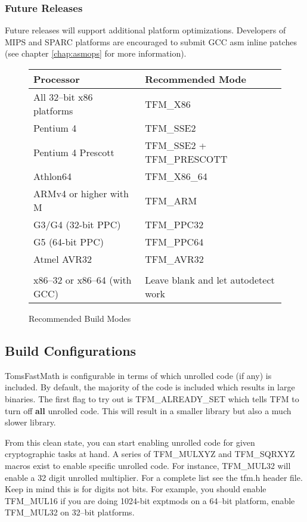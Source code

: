 \documentclass[b5paper]{book}
\begin{document}
\subsubsection{Future Releases}  Future releases will support additional platform optimizations.
Developers of MIPS and SPARC platforms are encouraged to submit GCC asm inline patches 
(see chapter \ref{chap:asmops} for more information).

\begin{figure}[here]
\begin{small}
\begin{center}
\begin{tabular}{|l|l|}
\hline \textbf{Processor} & \textbf{Recommended Mode} \\
\hline All 32--bit x86 platforms  & TFM\_X86 \\
\hline Pentium 4                  & TFM\_SSE2 \\
\hline Pentium 4 Prescott         & TFM\_SSE2 + TFM\_PRESCOTT \\
\hline Athlon64                   & TFM\_X86\_64 \\
\hline ARMv4 or higher with M     & TFM\_ARM \\
\hline G3/G4 (32-bit PPC)         & TFM\_PPC32 \\
\hline G5 (64-bit PPC)            & TFM\_PPC64 \\
\hline Atmel AVR32                & TFM\_AVR32 \\
\hline &\\
\hline x86--32 or x86--64 (with GCC) & Leave blank and let autodetect work \\
\hline
\end{tabular}
\caption{Recommended Build Modes}
\end{center}
\end{small}
\end{figure}

\subsection{Build Configurations}
TomsFastMath is configurable in terms of which unrolled code (if any) is included.  By default, the majority of the code is included which
results in large binaries.  The first flag to try out is TFM\_ALREADY\_SET which tells TFM to turn off \textbf{all} unrolled code.  This will
result in a smaller library but also a much slower library.

From this clean state, you can start enabling unrolled code for given cryptographic tasks at hand.  A series of TFM\_MULXYZ and TFM\_SQRXYZ macros
exist to enable specific unrolled code.  For instance, TFM\_MUL32 will enable a 32 digit unrolled multiplier.  For a complete list see the tfm.h header
file.  Keep in mind this is for digits not bits.  For example, you should enable TFM\_MUL16 if you are doing 1024-bit exptmods on a 64--bit platform, enable
TFM\_MUL32 on 32--bit platforms.
\end{document}
